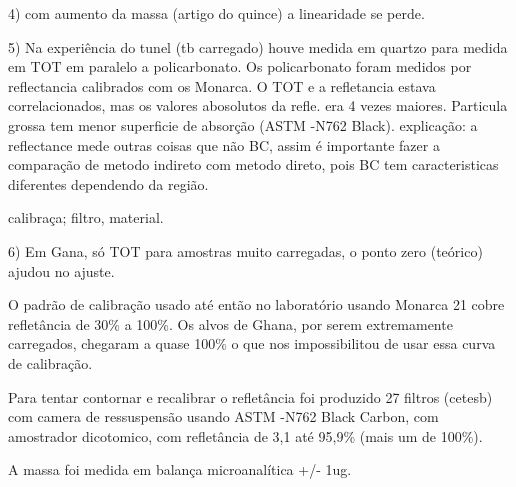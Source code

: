 4) com aumento da massa (artigo do quince) a linearidade se perde. 

5) Na experiência do tunel (tb carregado) houve medida em quartzo para medida
em TOT em paralelo a policarbonato. Os policarbonato foram medidos por reflectancia
calibrados com os Monarca. O TOT e a refletancia estava correlacionados, mas
os valores abosolutos da refle. era 4 vezes maiores.
Particula grossa tem menor superficie de absorção (ASTM -N762 Black). 
explicação: a reflectance mede outras coisas que não BC, assim é importante
fazer a comparação de metodo indireto com metodo direto, pois BC tem caracteristicas
diferentes dependendo da região.

calibraça; filtro, material.

6) Em Gana, só TOT para amostras muito carregadas, o ponto zero (teórico)
ajudou no ajuste.

O padrão de calibração usado até então no laboratório usando Monarca 21 cobre refletância de 30\% a 100\%. 
Os alvos de Ghana, por serem extremamente carregados, chegaram a quase 100\% o que nos impossibilitou de usar 
essa curva de calibração.  

Para tentar contornar e recalibrar o refletância foi produzido 27 filtros (cetesb) com camera de ressuspensão
usando ASTM -N762 Black Carbon, com amostrador dicotomico, com refletância de 3,1 até 95,9\% (mais um de 100\%).

A massa foi medida em balança microanalítica +/- 1ug.




